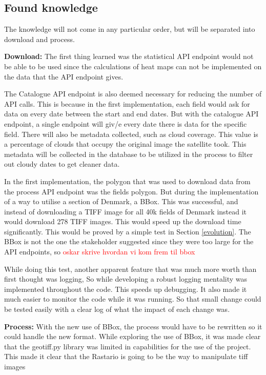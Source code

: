 \subsection{Found knowledge}
The knowledge will not come in any particular order, but will be separated into download and process.

\textbf{Download:}
The first thing learned was the statistical API endpoint would not be able to be used since the calculations of heat maps can not be implemented on the data that the API endpoint gives. 

The Catalogue API endpoint is also deemed necessary for reducing the number of API calls. This is because in the first implementation, each field would ask for data on every date between the start and end dates. But with the catalogue API endpoint, a single endpoint will giv/e every date there is data for the specific field. There will also be metadata collected, such as cloud coverage. This value is a percentage of clouds that occupy the original image the satellite took. This metadata will be collected in the database to be utilized in the process to filter out cloudy dates to get cleaner data.

In the first implementation, the polygon that was used to download data from the process API endpoint was the fields polygon. But during the implementation of a way to utilise a section of Denmark, a \acrfull{BBox}. This was successful, and instead of downloading a TIFF image for all 40k fields of Denmark instead it would download 278 TIFF images. This would speed up the download time significantly. This would be proved by a simple test in Section \ref{evolution}.
The BBox is not the one the stakeholder suggested since they were too large for the API endpoints, so \textcolor{red}{oskar skrive hvordan vi kom frem til bbox}

While doing this test, another apparent feature that was much more worth than first thought was logging, So while developing a robust logging mentality was implemented throughout the code.
This speeds up debugging. It also made it much easier to monitor the code while it was running. So that small change could be tested easily with a clear log of what the impact of each change was.

\textbf{Process:}
With the new use of BBox, the process would have to be rewritten so it could handle the new format. 
While exploring the use of BBox, it was made clear that the geotiff.py library was limited in capabilities for the use of the project. This made it clear that the Rastario is going to be the way to manipulate tiff images 


